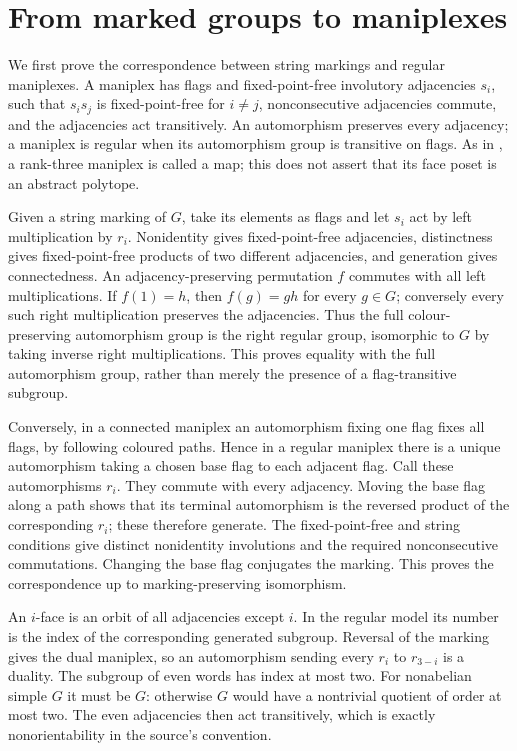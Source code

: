 \documentclass[11pt]{article}
\begin{document}
\section{From marked groups to maniplexes}
We first prove the correspondence between string markings and regular maniplexes. A maniplex has flags and
fixed-point-free involutory adjacencies $s_i$, such that $s_i s_j$ is
fixed-point-free for $i\ne j$, nonconsecutive adjacencies commute, and the
adjacencies act transitively. An automorphism preserves every adjacency;
a maniplex is regular when its automorphism group is transitive on flags.
As in \cite[Remark~2.1]{LT}, a rank-three maniplex is called a map; this
does not assert that its face poset is an abstract polytope.

Given a string marking of $G$, take its elements as flags and let $s_i$
act by left multiplication by $r_i$. Nonidentity gives fixed-point-free
adjacencies, distinctness gives fixed-point-free products of two different
adjacencies, and generation gives connectedness. An adjacency-preserving
permutation $f$ commutes with all left multiplications. If $f(1)=h$, then
$f(g)=gh$ for every $g\in G$; conversely every such right multiplication
preserves the adjacencies. Thus the full colour-preserving automorphism
group is the right regular group, isomorphic to $G$ by taking inverse
right multiplications. This proves equality with the full automorphism
group, rather than merely the presence of a flag-transitive subgroup.

Conversely, in a connected maniplex an automorphism fixing one flag fixes
all flags, by following coloured paths. Hence in a regular maniplex there
is a unique automorphism taking a chosen base flag to each adjacent flag.
Call these automorphisms $r_i$. They commute with every adjacency. Moving
the base flag along a path shows that its terminal automorphism is the
reversed product of the corresponding $r_i$; these therefore generate.
The fixed-point-free and string conditions give distinct nonidentity
involutions and the required nonconsecutive commutations. Changing the
base flag conjugates the marking. This proves the correspondence up to
marking-preserving isomorphism.

An $i$-face is an orbit of all adjacencies except $i$. In the regular model
its number is the index of the corresponding generated subgroup. Reversal
of the marking gives the dual maniplex, so an automorphism sending every
$r_i$ to $r_{3-i}$ is a duality. The subgroup of even words has index at
most two. For nonabelian simple $G$ it must be $G$: otherwise $G$ would
have a nontrivial quotient of order at most two. The even adjacencies then
act transitively, which is exactly nonorientability in the source's
convention.
\end{document}
